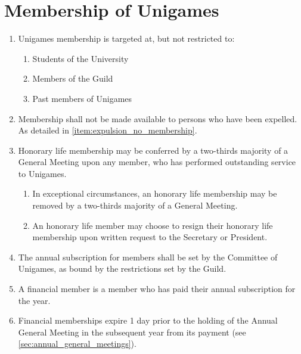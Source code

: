 \documentclass[a4paper]{article}
\begin{document}
\section{Membership of Unigames} \label{sec:membership}
\begin{enumerate}
    \item Unigames membership is targeted at, but not restricted to:
          \begin{enumerate}
              \item Students of the University
              \item Members of the Guild
              \item Past members of Unigames
          \end{enumerate}
    \item Membership shall not be made available to persons who have been expelled. As detailed in \cref{item:expulsion_no_membership}.
    \item Honorary life membership may be conferred by a two-thirds majority of a General Meeting upon any member, who has performed outstanding service to Unigames.
          \begin{enumerate}
              \item In exceptional circumstances, an honorary life membership may be removed by a two-thirds majority of a General Meeting.
              \item An honorary life member may choose to resign their honorary life membership upon written request to the Secretary or President.
          \end{enumerate}
    \item The annual subscription for members shall be set by the Committee of Unigames, as bound by the restrictions set by the Guild.
    \item A financial member is a member who has paid their annual subscription for the year.
    \item Financial memberships expire 1 day prior to the holding of the Annual General Meeting in the subsequent year from its payment (see \cref{sec:annual_general_meetings}).
\end{enumerate}
\end{document}
